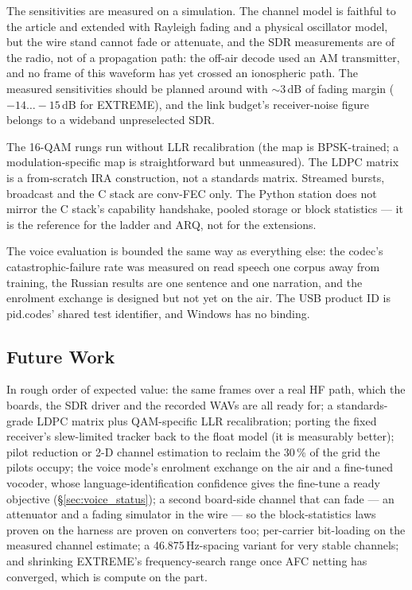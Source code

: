 The sensitivities are measured on a simulation.  The channel model is
faithful to the article and extended with Rayleigh fading and a
physical oscillator model, but the wire stand cannot fade or
attenuate, and the SDR measurements are of the radio, not of a
propagation path: the off-air decode used an AM transmitter, and no
frame of this waveform has yet crossed an ionospheric path.  The
measured sensitivities should be planned around with $\sim$3\,dB of
fading margin ($-14\ldots-15$\,dB for EXTREME), and the link budget's
receiver-noise figure belongs to a wideband unpreselected SDR.

The 16-QAM rungs run without LLR recalibration (the map is
BPSK-trained; a modulation-specific map is straightforward but
unmeasured).  The LDPC matrix is a from-scratch IRA construction, not a
standards matrix.  Streamed bursts, broadcast and the C stack are
conv-FEC only.  The Python station does not mirror the C stack's
capability handshake, pooled storage or block statistics --- it is the
reference for the ladder and ARQ, not for the extensions.

The voice evaluation is bounded the same way as everything else: the
codec's catastrophic-failure rate was measured on read speech one
corpus away from training, the Russian results are one sentence and
one narration, and the enrolment exchange is designed but not yet on
the air.  The USB product ID is pid.codes' shared test identifier, and
Windows has no binding.

\subsection{Future Work}

In rough order of expected value: the same frames over a real HF path,
which the boards, the SDR driver and the recorded WAVs are all ready
for; a standards-grade LDPC matrix plus QAM-specific LLR
recalibration; porting the fixed receiver's slew-limited tracker back
to the float model (it is measurably better); pilot reduction or 2-D
channel estimation to reclaim the 30\,\% of the grid the pilots
occupy; the voice mode's enrolment exchange on the air and a
fine-tuned vocoder, whose language-identification confidence gives the
fine-tune a ready objective (\S\ref{sec:voice_status}); a second
board-side channel that can fade --- an attenuator and a fading
simulator in the wire --- so the block-statistics laws proven on the
harness are proven on converters too; per-carrier bit-loading on the
measured channel estimate; a 46.875\,Hz-spacing variant for very
stable channels; and shrinking EXTREME's frequency-search range once
AFC netting has converged, which is compute on the part.
